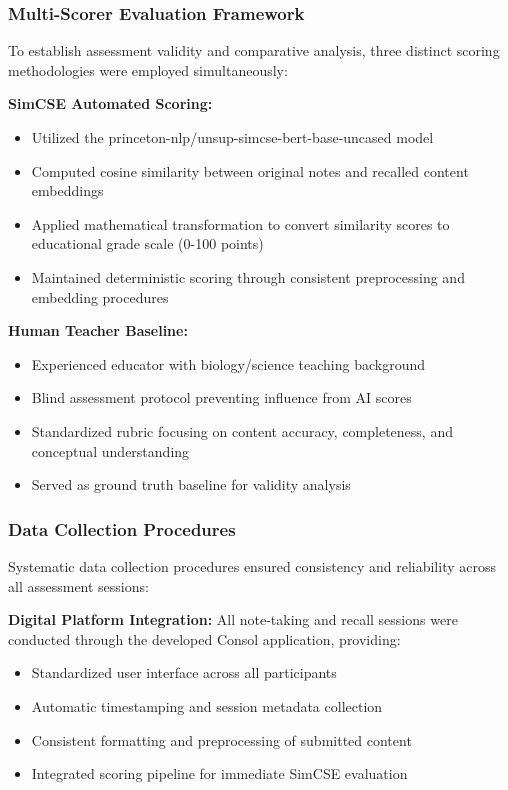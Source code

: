{\subsubsection{Multi-Scorer Evaluation Framework}

To establish assessment validity and comparative analysis, three distinct scoring methodologies were employed simultaneously:

\textbf{SimCSE Automated Scoring:}
\begin{itemize}
    \item Utilized the princeton-nlp/unsup-simcse-bert-base-uncased model
    \item Computed cosine similarity between original notes and recalled content embeddings
    \item Applied mathematical transformation to convert similarity scores to educational grade scale (0-100 points)
    \item Maintained deterministic scoring through consistent preprocessing and embedding procedures
\end{itemize}

{\color{maroon}
\textbf{Human Teacher Baseline:}
\begin{itemize}
    \item Experienced educator with biology/science teaching background
    \item Blind assessment protocol preventing influence from AI scores
    \item Standardized rubric focusing on content accuracy, completeness, and conceptual understanding
    \item Served as ground truth baseline for validity analysis
\end{itemize}
}

\subsubsection{Data Collection Procedures}

Systematic data collection procedures ensured consistency and reliability across all assessment sessions:

\textbf{Digital Platform Integration:} All note-taking and recall sessions were conducted through the developed Consol application, providing:
\begin{itemize}
    \item Standardized user interface across all participants
    \item Automatic timestamping and session metadata collection
    \item Consistent formatting and preprocessing of submitted content
    \item Integrated scoring pipeline for immediate SimCSE evaluation
\end{itemize}

}
